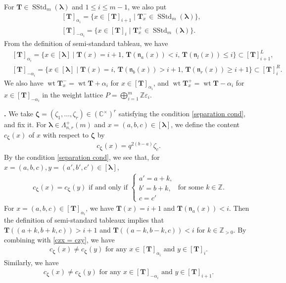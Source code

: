 \documentclass[12pt]{amsart}
\def \para{\refstepcounter{thm} \par\medskip\noindent
                \textbf{\thethm .} }
\numberwithin{equation}{thm}
\newcommand\CC{\mathbb C}
\newcommand\ZZ{\mathbb Z}
\newcommand\bT{\mathbf T}
\newcommand\fn{\mathfrak n}
\renewcommand\a{\alpha}  %
\newcommand\z{\zeta}
\newcommand\ve{\varepsilon}
\newcommand\vL{\varLambda}
\newcommand\Bz{\boldsymbol\zeta}
\newcommand\Bla{\boldsymbol\lambda}
\newcommand{\owt}{\operatorname{wt}}
\newcommand{\SStd}{\operatorname{SStd}}
\newcounter{ni}
\newcounter{go}
\begin{document}
For $\bT \in \SStd_m(\Bla)$ and $1 \leq i \leq m-1$, we also put  
\begin{align*}
& [\bT]_{\a_i} = \{x \in [\bT]_{i+1} \mid \bT_x^- \in \SStd_m (\Bla)\}, 
\\
& [\bT]_{-\a_i} = \{ x \in [\bT]_i \mid \bT_x^+ \in \SStd_m(\Bla) \}. 
\end{align*}
From the definition of semi-standard tableau, 
we have 
\begin{align*}
& [\bT]_{\a_i} = \{ x \in [\Bla] \mid \bT(x) =i+1, \, \bT (\fn_a (x)) <i, \, \bT(\fn_l(x)) \leq i \} \subset [\bT]_{i+1}^L, 
\\
& [\bT]_{-\a_i} = \{ x \in [\Bla] \mid \bT(x) =i, \, \bT(\fn_b(x)) >i+1, \, \bT( \fn_r(x)) \geq i+1\} \subset [\bT]_i^R. 
\end{align*}
We  also have $\owt \bT_x^- = \owt \bT + \a_i$ for $x \in [\bT]_{\a_i}$,  
and $\owt \bT_x^+ = \owt \bT - \a_i$ for $x \in [\bT]_{-\a_i}$ 
in the weight lattice $P=\bigoplus_{i=1}^m \ZZ \ve_i$. 


\para \label{cBz} 
We take $\Bz = (\z_1, \dots, \z_r) \in (\CC^{\times})^r$ satisfying the condition \eqref{separation cond}, and fix it. 
For $\Bla \in \vL_{n,r}^+(m)$ and $x =(a,b,c) \in [\Bla]$, 
we define the content $c_{\Bz} (x)$ of $x$ with respect to $\Bz$ by 
\begin{align*}
c_{\Bz} (x) = q^{2 (b-a)} \z_c.
\end{align*}
By the condition \eqref{separation cond}, 
we see that, 
for $x=(a,b,c), y =(a', b', c') \in [\Bla]$, 
\begin{align}
\label{czx = czy}
c_{\Bz} (x) = c_{\Bz} (y) 
\text{ if and only if } 
\begin{cases} 
	a'= a+k, 
	\\
	b'=b+k,  
	\\
	c=c' 
\end{cases} 
\text{ for some } k \in \ZZ.  
\end{align}
For $x =(a,b,c) \in [\bT]_{\a_i}$, we have $\bT(x) =i+1$ and $\bT(\fn_a (x)) <i$. 
Then the definition of semi-standard tableaux implies that 
$\bT((a +k, b+k, c)) >i+1$ and $\bT((a-k, b-k, c)) <i$ for $k \in \ZZ_{>0}$. 
By combining with \eqref{czx = czy}, 
we have 
\begin{align}
\label{czx not= czy ai}
c_{\Bz} (x) \not= c_{\Bz} (y) \text{ for any } 
x \in [\bT]_{\a_i} \text{ and } y \in [\bT]_i.
\end{align}
Similarly, we have 
\begin{align}
\label{czx not= czy -ai} 
c_{\Bz} (x) \not= c_{\Bz}(y) 
	\text{ for any } 
	x \in [\bT]_{-\a_i} \text{ and } y \in [\bT]_{i+1}. 
\end{align}
\end{document}
